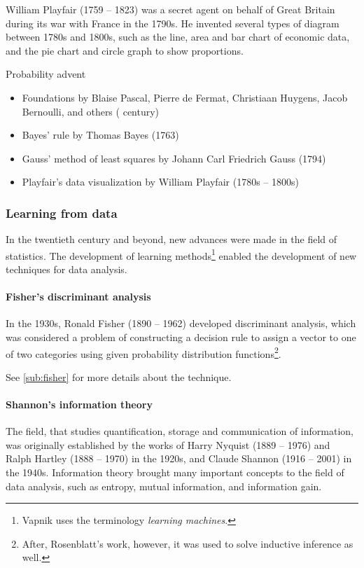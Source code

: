 William Playfair (1759 -- 1823) was a secret agent on behalf of Great Britain during its
war with France in the 1790s.  He invented several types of diagram between 1780s and
1800s, such as the line, area and bar chart of economic data, and the pie chart and circle
graph to show proportions.

\begin{slidebox}{Probability advent}{}
  \begin{itemize}
    \item Foundations by Blaise Pascal, Pierre de Fermat, Christiaan Huygens, Jacob
      Bernoulli, and others ( century)
    \item Bayes' rule by Thomas Bayes (1763)
    \item Gauss' method of least squares by Johann Carl Friedrich Gauss (1794)
    \item Playfair's data visualization by William Playfair (1780s -- 1800s)
  \end{itemize}
\end{slidebox}

\subsubsection{Learning from data}

In the twentieth century and beyond, new advances were made in the field of statistics.  The
development of learning methods\footnote{Vapnik uses the terminology \emph{learning
machines}.} enabled the development of new techniques for
data analysis.

\paragraph{Fisher's discriminant analysis}

In the 1930s, Ronald Fisher (1890 -- 1962) developed discriminant analysis, which was
considered a problem of constructing a decision rule to assign a vector to one of two
categories using given probability distribution functions\footnote{After, Rosenblatt's work,
however, it was used to solve inductive inference as well.}.

See \cref{sub:fisher} for more details about the technique.

\paragraph{Shannon's information theory}

The field, that studies quantification, storage and communication of information, was
originally established by the works of Harry Nyquist (1889 -- 1976) and Ralph Hartley
(1888 -- 1970) in the 1920s, and Claude Shannon (1916 -- 2001) in the 1940s.
Information theory brought many important concepts to the field of data analysis, such as
entropy, mutual information, and information gain.

